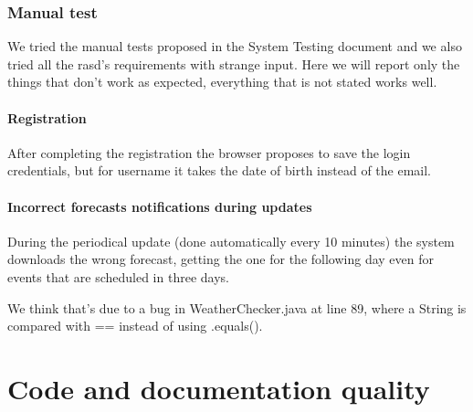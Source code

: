 \documentclass[10pt,a4paper,titlepage]{article}
\begin{document}
\section{Manual test}
We tried the manual tests proposed in the System Testing document and we also tried all the rasd's requirements with strange input. Here we will report only the things that don't work as expected, everything that is not stated works well.

\subsection{Registration}
After completing the registration the browser proposes to save the login credentials, but for username it takes the date of birth instead of the email.

\subsection{Incorrect forecasts notifications during updates}
During the periodical update (done automatically every 10 minutes) the system downloads the wrong forecast, getting the one for the following day even for events that are scheduled in three days.

We think that's due to a bug in WeatherChecker.java at line 89, where a String is compared with == instead of using .equals().

\pagebreak
\part{Code and documentation quality}
\label{part4}
\end{document}
